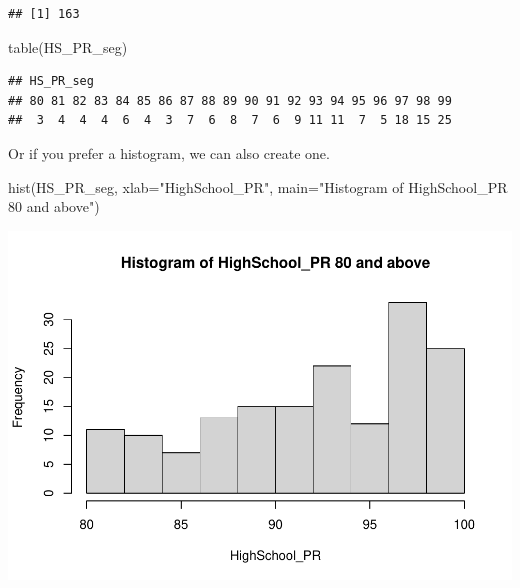 \documentclass[
]{article}
\newenvironment{Shaded}{\begin{snugshade}}{\end{snugshade}}
\newcommand{\AttributeTok}[1]{\textcolor[rgb]{0.77,0.63,0.00}{#1}}
\newcommand{\ConstantTok}[1]{\textcolor[rgb]{0.00,0.00,0.00}{#1}}
\newcommand{\FunctionTok}[1]{\textcolor[rgb]{0.00,0.00,0.00}{#1}}
\newcommand{\NormalTok}[1]{#1}
\newcommand{\OtherTok}[1]{\textcolor[rgb]{0.56,0.35,0.01}{#1}}
\newcommand{\SpecialCharTok}[1]{\textcolor[rgb]{0.00,0.00,0.00}{#1}}
\newcommand{\StringTok}[1]{\textcolor[rgb]{0.31,0.60,0.02}{#1}}
\begin{document}
\begin{Shaded}
\end{Shaded}

\begin{verbatim}
## [1] 163
\end{verbatim}

\begin{Shaded}
\begin{Highlighting}[]
\FunctionTok{table}\NormalTok{(HS\_PR\_seg)}
\end{Highlighting}
\end{Shaded}

\begin{verbatim}
## HS_PR_seg
## 80 81 82 83 84 85 86 87 88 89 90 91 92 93 94 95 96 97 98 99 
##  3  4  4  4  6  4  3  7  6  8  7  6  9 11 11  7  5 18 15 25
\end{verbatim}

Or if you prefer a histogram, we can also create one.

\begin{Shaded}
\begin{Highlighting}[]
\FunctionTok{hist}\NormalTok{(HS\_PR\_seg, }\AttributeTok{xlab=}\StringTok{"HighSchool\_PR"}\NormalTok{,}
     \AttributeTok{main=}\StringTok{"Histogram of HighSchool\_PR 80 and above"}\NormalTok{)}
\end{Highlighting}
\end{Shaded}

\includegraphics{PTT_Analysis_of_Test_Scores_Unfinished_files/figure-latex/high-school-pr-seg-hist-1.pdf}
\end{document}
